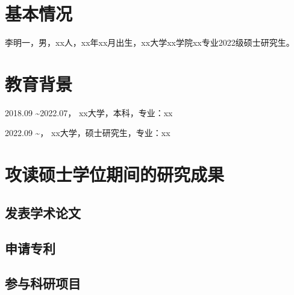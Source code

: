 \section{基本情况}
李明一，男，xx人，xx年xx月出生，xx大学xx学院xx专业2022级硕士研究生。

\section{教育背景}
2018.09 \textasciitilde 2022.07， xx大学，本科，专业：xx 

2022.09 \textasciitilde \qquad\quad\;， xx大学，硕士研究生，专业：xx 

\section{攻读硕士学位期间的研究成果}
\subsection{发表学术论文}

\subsection{申请专利}

\subsection{参与科研项目}


